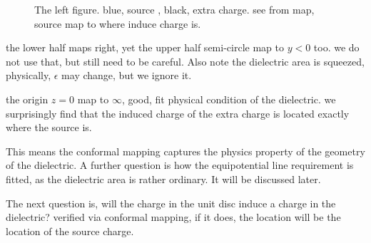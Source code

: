 \begin{figure}[H]
    \centering
    \hfill
    \caption{\small The left figure. blue, source , black, extra charge. see from map, source map to where induce charge is.}
\end{figure}

the lower half maps right, yet the upper half semi-circle map to $y<0$ too. we do not use that, but still need to be careful. Also note the dielectric area is squeezed, physically, $\epsilon$ may change, but we ignore it.

the origin $z=0$ map to $\infty$, good, fit physical condition of the dielectric.
we surprisingly find that the induced charge of the extra charge is located exactly where the source is. 

This means the conformal mapping captures the physics property of the geometry of the dielectric. A further question is how the equipotential line requirement is fitted, as the dielectric area is rather ordinary. It will be discussed later.

The next question is, will the charge in the unit disc induce a charge in the dielectric? verified via conformal mapping, if it does, the location will be the location of the source charge. 

